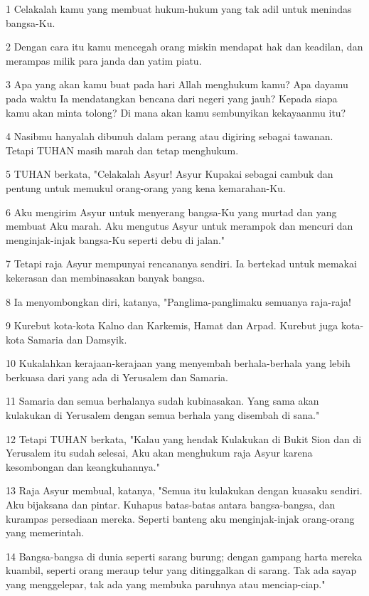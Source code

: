 \par 1 Celakalah kamu yang membuat hukum-hukum yang tak adil untuk menindas bangsa-Ku.
\par 2 Dengan cara itu kamu mencegah orang miskin mendapat hak dan keadilan, dan merampas milik para janda dan yatim piatu.
\par 3 Apa yang akan kamu buat pada hari Allah menghukum kamu? Apa dayamu pada waktu Ia mendatangkan bencana dari negeri yang jauh? Kepada siapa kamu akan minta tolong? Di mana akan kamu sembunyikan kekayaanmu itu?
\par 4 Nasibmu hanyalah dibunuh dalam perang atau digiring sebagai tawanan. Tetapi TUHAN masih marah dan tetap menghukum.
\par 5 TUHAN berkata, "Celakalah Asyur! Asyur Kupakai sebagai cambuk dan pentung untuk memukul orang-orang yang kena kemarahan-Ku.
\par 6 Aku mengirim Asyur untuk menyerang bangsa-Ku yang murtad dan yang membuat Aku marah. Aku mengutus Asyur untuk merampok dan mencuri dan menginjak-injak bangsa-Ku seperti debu di jalan."
\par 7 Tetapi raja Asyur mempunyai rencananya sendiri. Ia bertekad untuk memakai kekerasan dan membinasakan banyak bangsa.
\par 8 Ia menyombongkan diri, katanya, "Panglima-panglimaku semuanya raja-raja!
\par 9 Kurebut kota-kota Kalno dan Karkemis, Hamat dan Arpad. Kurebut juga kota-kota Samaria dan Damsyik.
\par 10 Kukalahkan kerajaan-kerajaan yang menyembah berhala-berhala yang lebih berkuasa dari yang ada di Yerusalem dan Samaria.
\par 11 Samaria dan semua berhalanya sudah kubinasakan. Yang sama akan kulakukan di Yerusalem dengan semua berhala yang disembah di sana."
\par 12 Tetapi TUHAN berkata, "Kalau yang hendak Kulakukan di Bukit Sion dan di Yerusalem itu sudah selesai, Aku akan menghukum raja Asyur karena kesombongan dan keangkuhannya."
\par 13 Raja Asyur membual, katanya, "Semua itu kulakukan dengan kuasaku sendiri. Aku bijaksana dan pintar. Kuhapus batas-batas antara bangsa-bangsa, dan kurampas persediaan mereka. Seperti banteng aku menginjak-injak orang-orang yang memerintah.
\par 14 Bangsa-bangsa di dunia seperti sarang burung; dengan gampang harta mereka kuambil, seperti orang meraup telur yang ditinggalkan di sarang. Tak ada sayap yang menggelepar, tak ada yang membuka paruhnya atau menciap-ciap."
